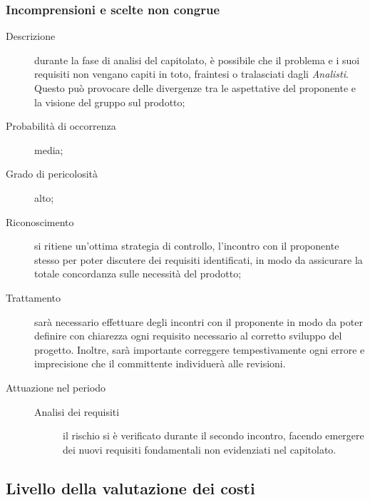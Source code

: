 		\subsubsection{Incomprensioni e scelte non congrue}
		\begin{description}
			\item[Descrizione] durante la fase di analisi del capitolato, è possibile che il problema e i suoi requisiti non vengano capiti in toto, fraintesi o tralasciati dagli \emph{Analisti}. Questo può provocare delle divergenze tra le aspettative del proponente e la visione del gruppo sul prodotto;
			\item[Probabilità di occorrenza] media;
			\item[Grado di pericolosità] alto;
			\item[Riconoscimento] si ritiene un'ottima strategia di controllo, l'incontro con il proponente stesso per poter discutere dei requisiti identificati, in modo da assicurare la totale concordanza sulle necessità del prodotto;
			\item[Trattamento] sarà necessario effettuare degli incontri con il proponente in modo da poter definire con chiarezza ogni requisito necessario al corretto sviluppo del progetto. Inoltre, sarà importante correggere tempestivamente ogni errore e imprecisione che il committente individuerà alle revisioni. 
			\item[Attuazione nel periodo]
			\begin{description}
				\item[Analisi dei requisiti]  il rischio si è verificato durante il secondo incontro, facendo emergere dei nuovi requisiti fondamentali non evidenziati nel capitolato.
			\end{description}
		\end{description}
	\subsection{Livello della valutazione dei costi} \label{sec:val}
